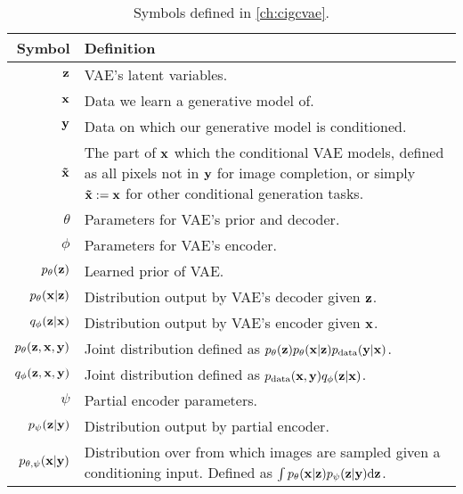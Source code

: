 \begin{table*}
  \caption{Symbols defined in \cref{ch:cigcvae}.}
  \label{tab:notation-appendix-cigcvae}
  \centering
  \footnotesize
  \begin{tabular}{rp{9cm}}
    \toprule
    Symbol    & Definition   \\
    \midrule
    ${\mathbf{z}}$                                   & VAE's latent variables. \\
    ${\mathbf{x}}$                                & Data we learn a generative model of. \\
    ${\mathbf{y}}$                            & Data on which our generative model is conditioned. \\
    $\mathbf{\tilde{x}}{}$                           & The part of ${\mathbf{x}}$ which the conditional VAE models, defined as all pixels not in ${\mathbf{y}}$ for image completion, or simply $\mathbf{\tilde{x}} := {\mathbf{x}}$ for other conditional generation tasks. \\
    $\theta$                              & Parameters for VAE's prior and decoder. \\
    $\phi$                                & Parameters for VAE's encoder. \\
    $p_\theta({\mathbf{z}})$                        & Learned prior of VAE. \\
    $p_\theta({\mathbf{x}}|{\mathbf{z}})$                   & Distribution output by VAE's decoder given ${\mathbf{z}}$. \\
    $q_\phi({\mathbf{z}}|{\mathbf{x}})$                           & Distribution output by VAE's encoder given ${\mathbf{x}}$. \\
    $p_\theta({\mathbf{z}}, {\mathbf{x}}, {\mathbf{y}})$        & Joint distribution defined as $p_\theta({\mathbf{z}})p_\theta({\mathbf{x}}|{\mathbf{z}})p_{\rm{data}} ({\mathbf{y}}|{\mathbf{x}})$. \\
    $q_\phi({\mathbf{z}},{\mathbf{x}}, {\mathbf{y}})$                 & Joint distribution defined as $p_{\rm{data}} ({\mathbf{x}}, {\mathbf{y}})q_\phi({\mathbf{z}}|{\mathbf{x}})$. \\
    $\psi$                            & Partial encoder parameters. \\
    $p_\psi({\mathbf{z}}|{\mathbf{y}})$                 & Distribution output by partial encoder. \\
    $p_{\theta,\psi}({\mathbf{x}}|{\mathbf{y}})$             & Distribution over from which images are sampled given a conditioning input. Defined as $\int p_\theta({\mathbf{x}}|{\mathbf{z}})p_\psi({\mathbf{z}}|{\mathbf{y}}) \mathrm{d}{\mathbf{z}}$. \\

\end{tabular}
\end{table*}
